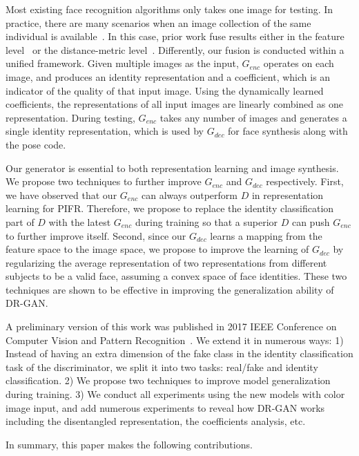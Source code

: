 \documentclass[10pt,journal,compsoc]{IEEEtran}
\begin{document}
Most existing face recognition algorithms only takes one image for testing. 
In practice, there are many scenarios when an image collection of the same individual is available~\cite{klare2015pushing}. 
In this case, prior work fuse results either in the feature level~\cite{chen2016unconstrained} or the distance-metric level~\cite{wang2016face,masi2016we}. 
Differently, our fusion is conducted within a unified framework. 
Given multiple images as the input, $G_{enc}$ operates on each image, and produces an identity representation and a coefficient, which is an indicator of the quality of that input image. 
Using the dynamically learned coefficients, the representations of all input images are linearly combined as one representation. 
During testing, $G_{enc}$ takes any number of images and generates a single identity representation, which is used by $G_{dec}$ for face synthesis along with the pose code. 

Our generator is essential to both representation learning and image synthesis. 
We propose two techniques to further improve $G_{enc}$ and $G_{dec}$ respectively. 
First, we have observed that our $G_{enc}$ can always outperform $D$ in representation learning for PIFR. 
Therefore, we propose to replace the identity classification part of $D$ with the latest $G_{enc}$ during training so that a superior $D$ can push $G_{enc}$ to further improve itself. 
Second, since our $G_{dec}$ learns a mapping from the feature space to the image space, we propose to improve the learning of $G_{dec}$ by regularizing the average representation of two representations from different subjects to be a valid face, assuming a convex space of face identities. 
These two techniques are shown to be effective in improving the generalization ability of DR-GAN. 

A preliminary version of this work was published in 2017 IEEE Conference on Computer Vision and Pattern Recognition~\cite{tran2017disentangled}. 
We extend it in numerous ways: 1) Instead of having an extra dimension of the fake class in the identity classification task of the discriminator, we split it into two tasks: real/fake and identity classification. 
2) We propose two techniques to improve model generalization during training. 
3) We conduct all experiments using the new models with color image input, and add numerous experiments to reveal how DR-GAN works including the disentangled representation, the coefficients analysis, etc. 

In summary, this paper makes the following contributions.
\end{document}
